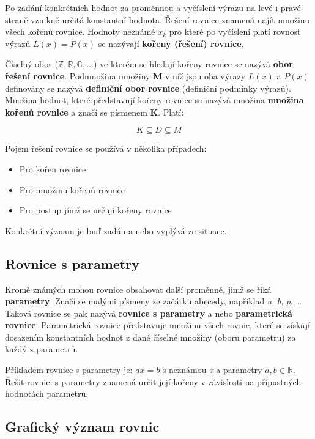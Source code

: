 \documentclass[11pt]{article}
\begin{document}
Po zadání konkrétních hodnot za proměnnou a vyčíslení výrazu na levé i pravé straně vznikně určitá konstantní hodnota. Řešení rovnice znamená najít množinu všech kořenů rovnice. Hodnoty neznámé $x_k$ pro které po vyčíslení platí rovnost výrazů $L(x) = P(x)$ se nazývají {\bf kořeny (řešení) rovnice}.

Číselný obor ($\mathbb{Z},\mathbb{R},\mathbb{C}, ...$) ve kterém se hledají kořeny rovnice se nazývá {\bf obor řešení rovnice}. Podmnožina množiny {\bf M} v níž jsou oba výrazy $L(x)$ a $P(x)$ definovány se nazývá {\bf definiční obor rovnice} (definiční podmínky výrazů). Množina hodnot, které představují kořeny rovnice se nazývá množina {\bf množina kořenů rovnice} a značí se písmenem {\bf K}. Platí:

$$ K \subseteq D \subseteq M $$

Pojem řešení rovnice se používá v několika případech:

\begin{itemize}
\item Pro kořen rovnice
\item Pro množinu kořenů rovnice
\item Pro postup jímž se určují kořeny rovnice
\end{itemize}

Konkrétní význam je buď zadán a nebo vyplývá ze situace.

\subsection{Rovnice s parametry}

Kromě známých mohou rovnice obsahovat další proměnné, jimž se říká {\bf parametry}. Značí se malými písmeny ze začátku abecedy, například {\it a}, {\it b}, {\it p}, … Taková rovnice se pak nazývá {\bf rovnice s parametry} a nebo  {\bf parametrická rovnice}. Parametrická rovnice představuje množinu všech rovnic, které se získají dosazením konstantních hodnot z dané číselné množiny (oboru parametru) za každý z parametrů.

Příkladem rovnice s parametry je: $ax = b$ s neznámou {\it x} a parametry $a, b \in \mathbb{R}$. Řešit rovnici s parametry znamená určit její kořeny v závislosti na přípustných hodnotách parametrů.

\begin{center}
\subsection{Grafický význam rovnic}
\end{center}
\end{document}
